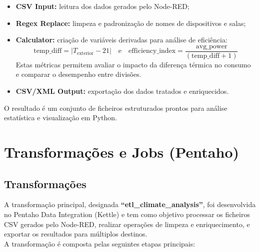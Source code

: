 \documentclass[a4paper, 12pt]{article} %
\begin{document}
\begin{itemize}
	\item \textbf{CSV Input:} leitura dos dados gerados pelo Node-RED;
	\item \textbf{Regex Replace:} limpeza e padronização de nomes de dispositivos e salas;
	\item \textbf{Calculator:} criação de variáveis derivadas para análise de eficiência:
	\[
	\text{temp\_diff} = |T_{\text{exterior}} - 21|
	\quad\text{e}\quad
	\text{efficiency\_index} = \frac{\text{avg\_power}}{(\text{temp\_diff} + 1)}
	\]
	Estas métricas permitem avaliar o impacto da diferença térmica no consumo e comparar o desempenho entre divisões.
	\item \textbf{CSV/XML Output:} exportação dos dados tratados e enriquecidos.
\end{itemize}

O resultado é um conjunto de ficheiros estruturados prontos para análise estatística e visualização em Python.



\newpage
\section{Transformações e Jobs (Pentaho)}

\subsection{Transformações}

A transformação principal, designada \textbf{``etl\_climate\_analysis''}, foi desenvolvida no Pentaho Data Integration (Kettle) e tem como objetivo processar os ficheiros CSV gerados pelo Node-RED, realizar operações de limpeza e enriquecimento, e exportar os resultados para múltiplos destinos.\\

A transformação é composta pelas seguintes etapas principais:
\end{document}
